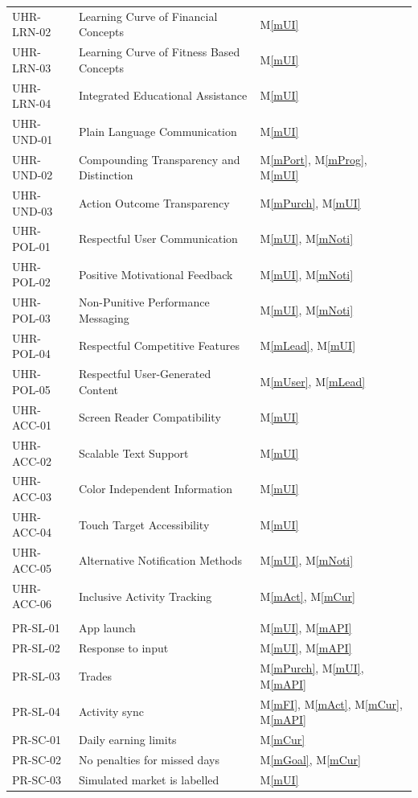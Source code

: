 \documentclass[12pt, titlepage]{article}
\newcommand{\mref}[1]{M\ref{#1}}
\begin{document}
{\begin{longtable}{>{\raggedright\arraybackslash}p{}
  >{\raggedright\arraybackslash}p{}
  >{\raggedright\arraybackslash}p{}}
UHR-LRN-02 & Learning Curve of Financial Concepts & \mref{mUI}\\
UHR-LRN-03 & Learning Curve of Fitness Based Concepts & \mref{mUI}\\
UHR-LRN-04 & Integrated Educational Assistance & \mref{mUI}\\
UHR-UND-01 & Plain Language Communication & \mref{mUI}\\
UHR-UND-02 & Compounding Transparency and Distinction & \mref{mPort}, \mref{mProg}, \mref{mUI}\\
UHR-UND-03 & Action Outcome Transparency & \mref{mPurch}, \mref{mUI}\\
UHR-POL-01 & Respectful User Communication & \mref{mUI}, \mref{mNoti}\\
UHR-POL-02 & Positive Motivational Feedback & \mref{mUI}, \mref{mNoti}\\
UHR-POL-03 & Non-Punitive Performance Messaging & \mref{mUI}, \mref{mNoti}\\
UHR-POL-04 & Respectful Competitive Features & \mref{mLead}, \mref{mUI}\\
UHR-POL-05 & Respectful User-Generated Content & \mref{mUser}, \mref{mLead}\\
UHR-ACC-01 & Screen Reader Compatibility & \mref{mUI}\\
UHR-ACC-02 & Scalable Text Support & \mref{mUI}\\
UHR-ACC-03 & Color Independent Information & \mref{mUI}\\
UHR-ACC-04 & Touch Target Accessibility & \mref{mUI}\\
UHR-ACC-05 & Alternative Notification Methods & \mref{mUI}, \mref{mNoti}\\
UHR-ACC-06 & Inclusive Activity Tracking & \mref{mAct}, \mref{mCur}\\
\midrule
\multicolumn{3}{l}{\textit{Performance Requirements}}\\
PR-SL-01 & App launch & \mref{mUI}, \mref{mAPI}\\
PR-SL-02 & Response to input & \mref{mUI}, \mref{mAPI}\\
PR-SL-03 & Trades & \mref{mPurch}, \mref{mUI}, \mref{mAPI}\\
PR-SL-04 & Activity sync & \mref{mFI}, \mref{mAct}, \mref{mCur}, \mref{mAPI}\\
PR-SC-01 & Daily earning limits & \mref{mCur}\\
PR-SC-02 & No penalties for missed days & \mref{mGoal}, \mref{mCur}\\
PR-SC-03 & Simulated market is labelled & \mref{mUI}\\

\end{longtable}}
\end{document}
